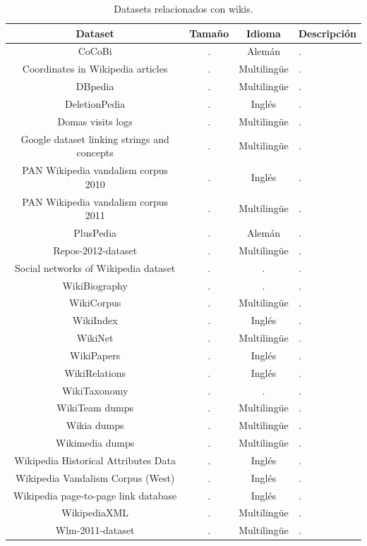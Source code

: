 \documentclass[11pt,onecolumn]{article}
\begin{document}
\begin{table}
\centering
\begin{tabular}{| c | c | c | l |}
\hline
\textbf{Dataset} & \textbf{Tamaño} & \textbf{Idioma} & \textbf{Descripción} \\
\hline
CoCoBi & . & Alemán & . \\
Coordinates in Wikipedia articles & . & Multilingüe & . \\
DBpedia & . & Multilingüe & . \\
DeletionPedia & . & Inglés & . \\
Domas visits logs & . & Multilingüe & . \\
Google dataset linking strings and concepts & . & Multilingüe & . \\
PAN Wikipedia vandalism corpus 2010 & . & Inglés & . \\
PAN Wikipedia vandalism corpus 2011 & . & Multilingüe & . \\
PlusPedia & . & Alemán & . \\
Repos-2012-dataset & . & Multilingüe & . \\
Social networks of Wikipedia dataset & . & . & . \\
WikiBiography & . & . & . \\
WikiCorpus & . & Multilingüe & . \\
WikiIndex & . & Inglés & . \\
WikiNet & . & Multilingüe & . \\
WikiPapers & . & Inglés & . \\
WikiRelations & . & Inglés & . \\
WikiTaxonomy & . & . & . \\
WikiTeam dumps & . & Multilingüe & . \\
Wikia dumps & . & Multilingüe & . \\
Wikimedia dumps & . & Multilingüe & . \\
Wikipedia Historical Attributes Data & . & Inglés & . \\
Wikipedia Vandalism Corpus (West) & . & Inglés & . \\
Wikipedia page-to-page link database & . & Inglés & . \\
WikipediaXML & . & Multilingüe & . \\
Wlm-2011-dataset & . & Multilingüe & . \\

\hline
\end{tabular}
\caption{Datasets relacionados con wikis.}
\label{tab:datasetstable}
\end{table}
\end{document}
